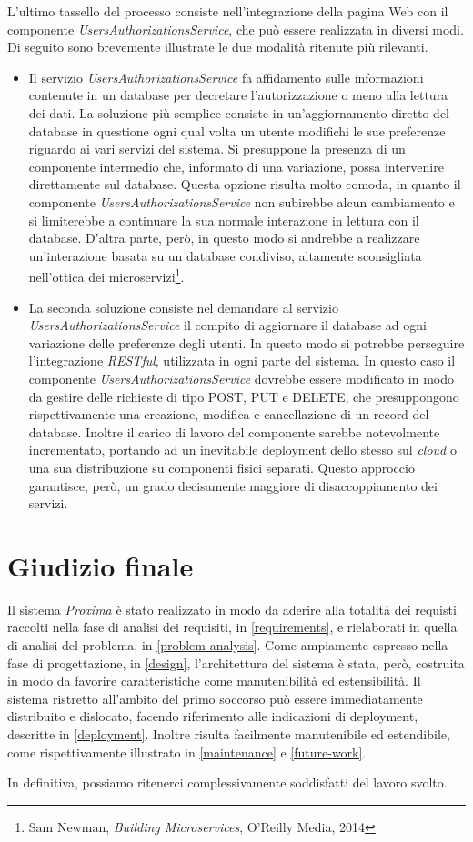 \documentclass[a4paper,12pt]{report}
\begin{document}
L'ultimo tassello del processo consiste nell'integrazione della pagina Web con il componente \emph{UsersAuthorizationsService}, che può essere realizzata in diversi modi. Di seguito sono brevemente illustrate le due modalità ritenute più rilevanti.
\begin{itemize}
	\item Il servizio \emph{UsersAuthorizationsService} fa affidamento sulle informazioni contenute in un database per decretare l'autorizzazione o meno alla lettura dei dati. La soluzione più semplice consiste in un'aggiornamento diretto del database in questione ogni qual volta un utente modifichi le sue preferenze riguardo ai vari servizi del sistema. Si presuppone la presenza di un componente intermedio che, informato di una variazione, possa intervenire direttamente sul database. Questa opzione risulta molto comoda, in quanto il componente \emph{UsersAuthorizationsService} non subirebbe alcun cambiamento e si limiterebbe a continuare la sua normale interazione in lettura con il database. D'altra parte, però, in questo modo si andrebbe a realizzare un'interazione basata su un database condiviso, altamente sconsigliata nell'ottica dei microservizi\footnote{Sam Newman, {\em Building Microservices}, O'Reilly Media, 2014}.
	\item La seconda soluzione consiste nel demandare al servizio \emph{UsersAuthorizationsService} il compito di aggiornare il database ad ogni variazione delle preferenze degli utenti. In questo modo si potrebbe perseguire l'integrazione \emph{RESTful}, utilizzata in ogni parte del sistema. In questo caso il componente \emph{UsersAuthorizationsService} dovrebbe essere modificato in modo da gestire delle richieste di tipo POST, PUT e DELETE, che presuppongono rispettivamente una creazione, modifica e cancellazione di un record del database. Inoltre il carico di lavoro del componente sarebbe notevolmente incrementato, portando ad un inevitabile deployment dello stesso sul \emph{cloud} o una sua distribuzione su componenti fisici separati. Questo approccio garantisce, però, un grado decisamente maggiore di disaccoppiamento dei servizi.
\end{itemize}
 
\section{Giudizio finale}
Il sistema \emph{Proxima} è stato realizzato in modo da aderire alla totalità dei requisti raccolti nella fase di analisi dei requisiti, in \autoref{requirements}, e rielaborati in quella di analisi del problema, in \autoref{problem-analysis}. Come ampiamente espresso nella fase di progettazione, in \autoref{design}, l'architettura del sistema è stata, però, costruita in modo da favorire caratteristiche come manutenibilità ed estensibilità. Il sistema ristretto all'ambito del primo soccorso può essere immediatamente distribuito e dislocato, facendo riferimento alle indicazioni di deployment, descritte in \autoref{deployment}. Inoltre risulta facilmente manutenibile ed estendibile, come rispettivamente illustrato in \autoref{maintenance} e \autoref{future-work}.

In definitiva, possiamo ritenerci complessivamente soddisfatti del lavoro svolto. 
 
\end{document}
